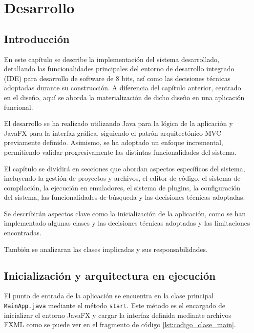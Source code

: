 \documentclass[../../main.tex]{subfiles}
\begin{document}
\chapter{Desarrollo}
\label{C:desarrollo}

\section{Introducción}

En este capítulo se describe la implementación del sistema desarrollado, detallando las funcionalidades principales del entorno de desarrollo integrado (IDE) para desarrollo de software de 8 bits, así como las decisiones técnicas adoptadas durante su construcción. A diferencia del capítulo anterior, centrado en el diseño, aquí se aborda la materialización de dicho diseño en una aplicación funcional.

El desarrollo se ha realizado utilizando Java para la lógica de la aplicación y JavaFX para la interfaz gráfica, siguiendo el patrón arquitectónico MVC previamente definido. Asimismo, se ha adoptado un enfoque incremental, permitiendo validar progresivamente las distintas funcionalidades del sistema.

El capítulo se dividirá en secciones que abordan aspectos específicos del sistema, incluyendo la gestión de proyectos y archivos, el editor de código, el sistema de compilación, la ejecución en emuladores, el sistema de plugins, la configuración del sistema, las funcionalidades de búsqueda y las decisiones técnicas adoptadas.

Se describirán aspectos clave como la inicialización de la aplicación, como se han implementado algunas clases y las decisiones técnicas adoptadas y las limitaciones encontradas.

También se analizaran las clases implicadas y sus responsabilidades.

\clearpage

\section{Inicialización y arquitectura en ejecución}

El punto de entrada de la aplicación se encuentra en la clase principal \lstinline|MainApp.java| mediante el método \lstinline|start|. Este método es el encargado de inicializar el entorno JavaFX y cargar la interfaz definida mediante archivos FXML como se puede ver en el fragmento de código \ref{lst:codigo_clase_main}. 
\end{document}
